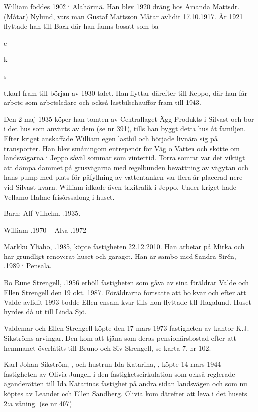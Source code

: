 William föddes 1902 i Alahärmä. Han blev 1920 dräng hos Amanda Mattsdr.(Måtar) Nylund, vars man Gustaf Mattsson Måtar avlidit 17.10.1917. År 1921 flyttade han till Back där han fanns bosatt som ba{c{k{s{t{}.karl fram till början av 1930-talet. Han flyttar därefter till Keppo, där han får arbete som arbetsledare och också lastbilschaufför fram till 1943.

Den 2 maj 1935 köper han tomten av Centrallaget Ägg Produkts i Silvast och bor i det hus som använts av dem (se nr 391), tills han byggt detta hus åt familjen. Efter kriget anskaffade William egen lastbil och började livnära sig på transporter. Han blev småningom entrepenör för Väg o Vatten och skötte om landsvägarna i Jeppo såväl sommar som vintertid. Torra somrar var det viktigt att dämpa dammet på grusvägarna med regelbunden bevattning av vägytan och hans pump med plats för påfyllning av vattentanken var flera år placerad nere vid Silvast kvarn. William idkade även taxitrafik i Jeppo. Under kriget hade Vellamo Halme frisörssalong i huset.

Barn: Alf Vilhelm, .1935.

William .1970  --  Alva .1972



Markku Yliaho, .1985, köpte fastigheten 22.12.2010. Han arbetar på Mirka och har grundligt renoverat huset och garaget. Han är sambo med Sandra Sirén, .1989 i Pensala.

Bo Rune Strengell, .1956 erhöll fastigheten som gåva av sina föräldrar Valde och Ellen Strengell den 19 okt. 1987. Föräldrarna fortsatte att bo kvar och efter att Valde avlidit 1993 bodde Ellen ensam kvar tills hon flyttade till Hagalund. Huset hyrdes då ut till Linda Sjö.



Valdemar och Ellen Strengell köpte den 17 mars 1973 fastigheten av kantor K.J. Sikströms arvingar. Den kom att tjäna som deras pensionärsbostad efter att hemmanet överlåtits till Bruno och Siv Strengell, se karta 7, nr 102.

Karl Johan Sikström, , och hustrun Ida Katarina, , köpte 14 mars 1944 fastigheten av Olivia Jungell i den fastighetscirkulation som också reglerade äganderätten till Ida Katarinas fastighet på andra sidan landsvägen och som nu köptes av Leander och Ellen Sandberg. Olivia kom därefter att leva i det husets 2:a våning. (se nr 407)

}}}}
